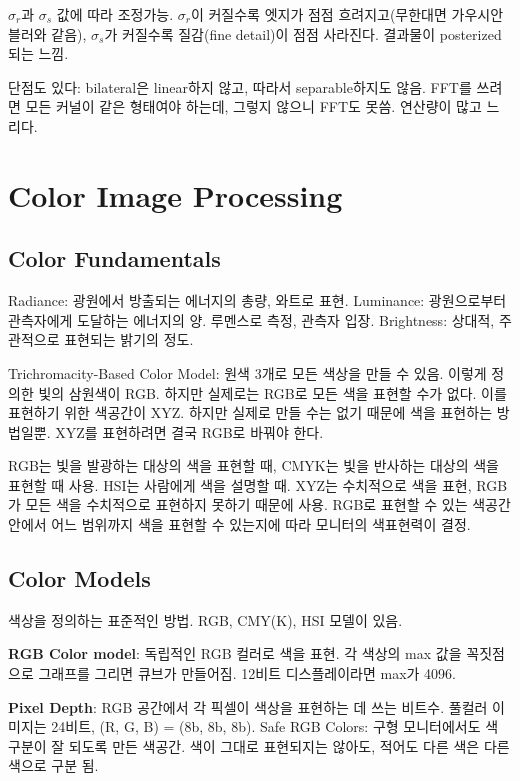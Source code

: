 $\sigma_r$과 $\sigma_s$ 값에 따라 조정가능. $\sigma_r$이 커질수록 엣지가 점점 흐려지고(무한대면 가우시안 블러와 같음), $\sigma_s$가 커질수록 질감(fine detail)이 점점 사라진다. 결과물이 posterized되는 느낌.

단점도 있다: bilateral은 linear하지 않고, 따라서 separable하지도 않음. FFT를 쓰려면 모든 커널이 같은 형태여야 하는데, 그렇지 않으니 FFT도 못씀. 연산량이 많고 느리다.

\section{Color Image Processing}

\subsection{Color Fundamentals}

Radiance: 광원에서 방출되는 에너지의 총량, 와트로 표현. Luminance: 광원으로부터 관측자에게 도달하는 에너지의 양. 루멘스로 측정, 관측자 입장. Brightness: 상대적, 주관적으로 표현되는 밝기의 정도.

Trichromacity-Based Color Model: 원색 3개로 모든 색상을 만들 수 있음. 이렇게 정의한 빛의 삼원색이 RGB. 하지만 실제로는 RGB로 모든 색을 표현할 수가 없다. 이를 표현하기 위한 색공간이 XYZ. 하지만 실제로 만들 수는 없기 때문에 색을 표현하는 방법일뿐. XYZ를 표현하려면 결국 RGB로 바꿔야 한다.

RGB는 빛을 발광하는 대상의 색을 표현할 때, CMYK는 빛을 반사하는 대상의 색을 표현할 때 사용. HSI는 사람에게 색을 설명할 때. XYZ는 수치적으로 색을 표현, RGB가 모든 색을 수치적으로 표현하지 못하기 때문에 사용. RGB로 표현할 수 있는 색공간 안에서 어느 범위까지 색을 표현할 수 있는지에 따라 모니터의 색표현력이 결정.

\subsection{Color Models}

색상을 정의하는 표준적인 방법. RGB, CMY(K), HSI 모델이 있음.

\textbf{RGB Color model}: 독립적인 RGB 컬러로 색을 표현. 각 색상의 max 값을 꼭짓점으로 그래프를 그리면 큐브가 만들어짐. 12비트 디스플레이라면 max가 4096.

\textbf{Pixel Depth}: RGB 공간에서 각 픽셀이 색상을 표현하는 데 쓰는 비트수. 풀컬러 이미지는 24비트, (R, G, B) = (8b, 8b, 8b). Safe RGB Colors: 구형 모니터에서도 색 구분이 잘 되도록 만든 색공간. 색이 그대로 표현되지는 않아도, 적어도 다른 색은 다른 색으로 구분 됨.

